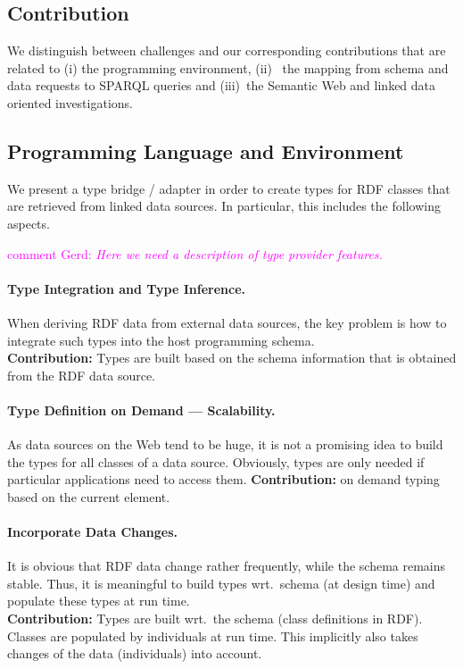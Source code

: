 \documentclass{llncs} %
\newcommand{\ggr}[1]{\textcolor{magenta}{comment Gerd: \textit{#1}}}
\begin{document}


\subsection{Contribution}

We distinguish between challenges and our corresponding contributions 
that are related to (i) the programming environment, (ii)~ the mapping from
schema and data requests to SPARQL queries and (iii)~the Semantic Web and linked data
oriented investigations.

\subsection*{Programming Language and Environment}

We present a type bridge / adapter in order to create types for RDF classes that
are retrieved from linked data sources. In particular, this includes the following aspects.

\ggr{Here we need a description of type provider features.}

\paragraph*{\bf Type Integration and Type Inference.}
When deriving RDF data from external data sources, the key problem is how to integrate
such types into the host programming schema. \\
\textbf{Contribution:} Types are built based on the schema information that is obtained
from the RDF data source.   \\

\paragraph{\bf Type Definition on Demand --- Scalability.}
As data sources on the Web tend to be huge, it is not a promising idea to
build the types for all classes of a data source.
Obviously, types are only needed if particular applications need to access them.
\textbf{Contribution:} on demand typing based on the current element. \\


\paragraph*{\bf Incorporate Data Changes.}
It is obvious that RDF data change rather frequently, while the
schema remains stable. Thus, it is meaningful to build types wrt.\ schema (at design time)
and populate these types at run time.\\
\textbf{Contribution:} Types are built wrt.\ the schema (class definitions in RDF).
Classes are populated by individuals at run time.
This implicitly also takes changes of the data (individuals) into account. \\
\end{document}
